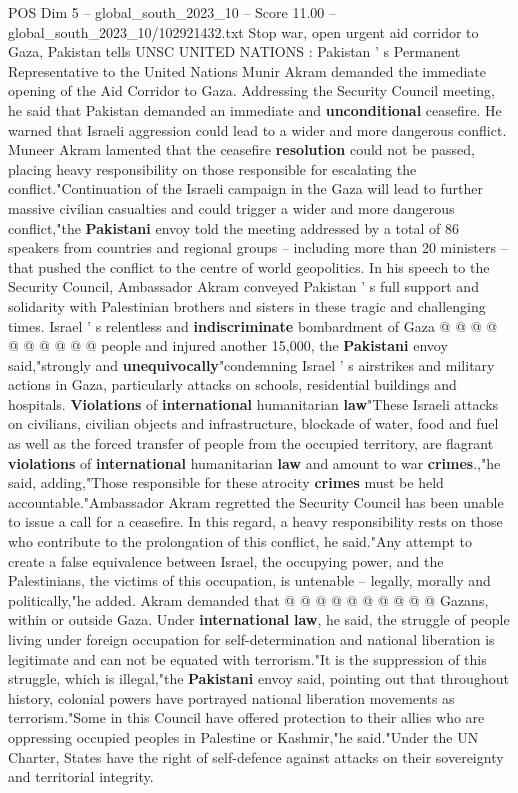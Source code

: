 \begin{textsample}{POS Dim 5 – global\_south\_2023\_10 – Score 11.00 – global\_south\_2023\_10/102921432.txt}  \label{ex:f5_pos_367}
Stop war, open urgent aid corridor to Gaza, Pakistan tells UNSC UNITED NATIONS : Pakistan ' s Permanent Representative to the United Nations Munir Akram demanded the immediate opening of the Aid Corridor to Gaza.
Addressing the Security Council meeting, he said that Pakistan demanded an immediate and \textbf{unconditional} ceasefire.
He warned that Israeli aggression could lead to a wider and more dangerous conflict.
Muneer Akram lamented that the ceasefire \textbf{resolution} could not be passed, placing heavy responsibility on those responsible for escalating the conflict."Continuation of the Israeli campaign in the Gaza will lead to further massive civilian casualties and could trigger a wider and more dangerous conflict,"the \textbf{Pakistani} envoy told the meeting addressed by a total of 86 speakers from countries and regional groups -- including more than 20 ministers -- that pushed the conflict to the centre of world geopolitics.
In his speech to the Security Council, Ambassador Akram conveyed Pakistan ' s full support and solidarity with Palestinian brothers and sisters in these tragic and challenging times.
Israel ' s relentless and \textbf{indiscriminate} bombardment of Gaza @ @ @ @ @ @ @ @ @ @ people and injured another 15,000, the \textbf{Pakistani} envoy said,"strongly and \textbf{unequivocally}"condemning Israel ' s airstrikes and military actions in Gaza, particularly attacks on schools, residential buildings and hospitals. \textbf{Violations} of \textbf{international} humanitarian \textbf{law}"These Israeli attacks on civilians, civilian objects and infrastructure, blockade of water, food and fuel as well as the forced transfer of people from the occupied territory, are flagrant \textbf{violations} of \textbf{international} humanitarian \textbf{law} and amount to war \textbf{crimes}.,"he said, adding,"Those responsible for these atrocity \textbf{crimes} must be held accountable."Ambassador Akram regretted the Security Council has been unable to issue a call for a ceasefire.
In this regard, a heavy responsibility rests on those who contribute to the prolongation of this conflict, he said."Any attempt to create a false equivalence between Israel, the occupying power, and the Palestinians, the victims of this occupation, is untenable -- legally, morally and politically,"he added.
Akram demanded that @ @ @ @ @ @ @ @ @ @ Gazans, within or outside Gaza.
Under \textbf{international} \textbf{law}, he said, the struggle of people living under foreign occupation for self-determination and national liberation is legitimate and can not be equated with terrorism."It is the suppression of this struggle, which is illegal,"the \textbf{Pakistani} envoy said, pointing out that throughout history, colonial powers have portrayed national liberation movements as terrorism."Some in this Council have offered protection to their allies who are oppressing occupied peoples in Palestine or Kashmir,"he said."Under the UN Charter, States have the right of self-defence against attacks on their sovereignty and territorial integrity.

\end{textsample}
